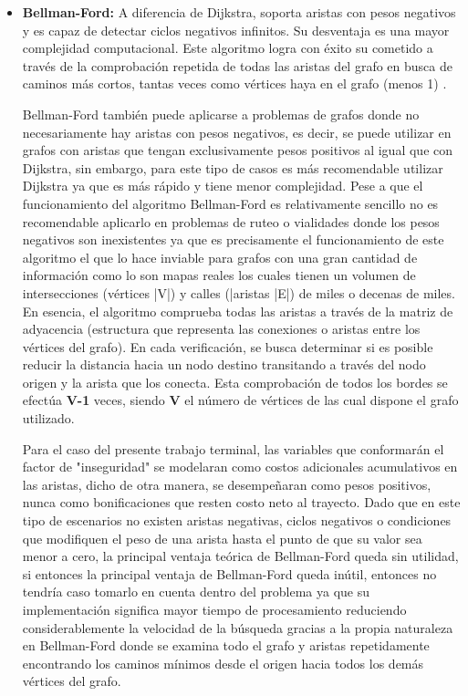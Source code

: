 \begin{itemize}
    \item \textbf{Bellman-Ford:} A diferencia de Dijkstra, soporta aristas con pesos negativos y es capaz de detectar ciclos negativos infinitos. Su desventaja es una mayor complejidad computacional. Este algoritmo logra con éxito su cometido a través de la comprobación repetida de todas las aristas del grafo en busca de caminos más cortos, tantas veces como vértices haya en el grafo (menos 1) \cite{w3sch_bellmanford}. 

    Bellman-Ford también puede aplicarse a problemas de grafos donde no necesariamente hay aristas con pesos negativos, es decir, se puede utilizar en grafos con aristas que tengan exclusivamente pesos positivos al igual que con Dijkstra, sin embargo, para este tipo de casos es más recomendable utilizar Dijkstra ya que es más rápido y tiene menor complejidad. Pese a que el funcionamiento del algoritmo Bellman-Ford es relativamente sencillo no es recomendable aplicarlo en problemas de ruteo o vialidades donde los pesos negativos son inexistentes ya que es precisamente el funcionamiento de este algoritmo el que lo hace inviable para grafos con una gran cantidad de información como lo son mapas reales los cuales tienen un volumen de intersecciones (vértices |V|) y calles (|aristas |E|) de miles o decenas de miles. En esencia, el algoritmo comprueba todas las aristas a través de la matriz de adyacencia (estructura que representa las conexiones o aristas entre los vértices del grafo). En cada verificación, se busca determinar si es posible reducir la distancia hacia un nodo destino transitando a través del nodo origen y la arista que los conecta. Esta comprobación de todos los bordes se efectúa \textbf{V-1} veces, siendo \textbf{V} el número de vértices de las cual dispone el grafo utilizado. 

    Para el caso del presente trabajo terminal, las variables que conformarán el factor de "inseguridad" se modelaran como costos adicionales acumulativos en las aristas, dicho de otra manera, se desempeñaran como pesos positivos, nunca como bonificaciones que resten costo neto al trayecto. Dado que en este tipo de escenarios no existen aristas negativas, ciclos negativos o condiciones que modifiquen el peso de una arista hasta el punto de que su valor sea menor a cero, la principal ventaja teórica de Bellman-Ford queda sin utilidad, si entonces la principal ventaja de Bellman-Ford queda inútil, entonces no tendría caso tomarlo en cuenta dentro del problema ya que su implementación significa mayor tiempo de procesamiento reduciendo considerablemente la velocidad de la búsqueda gracias a la propia naturaleza en Bellman-Ford donde se examina todo el grafo y aristas repetidamente encontrando los caminos mínimos desde el origen hacia todos los demás vértices del grafo.


\end{itemize}
